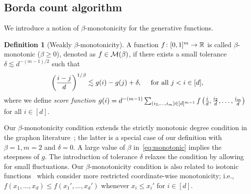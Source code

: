 \documentclass[12pt]{article}
\theoremstyle{definition}
\newtheorem{defn}{Definition}
\begin{document}
\subsection{Borda count algorithm}
We introduce a notion of $\beta$-monotonicity for the generative functions.
\begin{defn}[Weakly $\beta$-monotonicity]\label{eq:bdefn}A function $f\colon[0,1]^m \rightarrow \mathbb{R}$ is called $\beta$-monotonic ($\beta\geq 0$), denoted as $f\in\mathcal{M}(\beta)$, if there exists a small tolerance $\delta\lesssim d^{-(m-1)/2}$ such that
\begin{align}\label{eq:monotonic}
   \left({i-j\over d}\right)^{1/\beta}  \lesssim g(i)-g(j)+\delta,\quad \text{ for all } j<i\in[d],
\end{align}
where we define \emph{score function} $g(i) = d^{-(m-1)}\sum_{(i_2,\ldots,i_m)\in[d]^{m-1}} f\left({i\over d},{i_2\over d},\ldots,{i_m\over d}\right)$ for all $i \in[d]$.
\end{defn}

 
Our $\beta$-monotonicity condition extends the strictly monotonic degree condition in the graphon literature~\citep{chan2014consistent}; the latter is a special case of our definition with $\beta=1, m=2$ and $\delta=0$. A large value of $\beta$ in~\eqref{eq:monotonic} implies the steepness of $g$. The introduction of tolerance $\delta$ relaxes the condition by allowing for small fluctuations. Our $\beta$-monotonicity condition is also related to isotonic functions~\citep{pananjady2020isotonic} which consider more restricted coordinate-wise monotonicity; i.e., $f(x_1,\ldots,x_d)\leq f(x_1',\ldots,x_d')$
whenever $x_i\leq x_i'$ for $i\in[d]$. 
\end{document}
